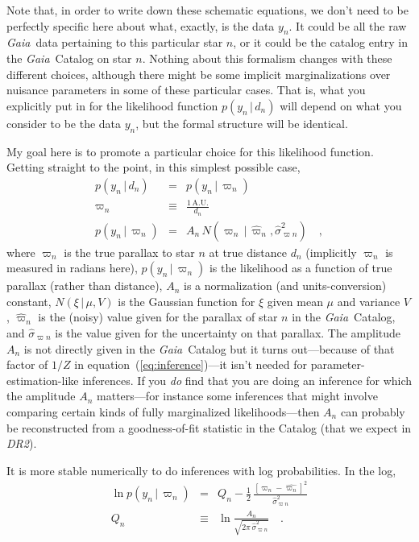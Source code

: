 \documentclass[12pt, modern]{aastex62h}
\newcommand{\acronym}[1]{{\small{#1}}}
\newcommand{\Gaia}{\textsl{Gaia}}
\newcommand{\DRtwo}{\textsl{\acronym{DR2}}}
\newcommand{\equationname}{equation}
\newcommand{\AU}{\mathrm{A.U.}}
\newcommand{\given}{\,|\,}
\begin{document}
Note that, in order to write down these schematic equations,
we don't need to be perfectly specific here about what, exactly,
is the data $y_n$.
It could be all the raw \Gaia\ data pertaining to this particular star $n$,
or it could be the catalog entry in the \Gaia\ Catalog on star $n$.
Nothing about this formalism changes with these different choices,
although there might be some implicit marginalizations over nuisance
parameters in some of these particular cases.
That is, what you explicitly put in for the likelihood function $p(y_n\given d_n)$
will depend on what you consider to be the data $y_n$, but the formal structure
will be identical.

My goal here is to promote a particular choice for this likelihood function.
Getting straight to the point, in this simplest possible case, 
\begin{eqnarray}
p(y_n\given d_n) &=& p(y_n\given\varpi_n)
\label{eq:gotoparallax}
\\
\varpi_n &\equiv& \frac{1\,\AU}{d_n}
\\
p(y_n\given\varpi_n) &=& A_n\,N(\varpi_n\given\hat{\varpi}_n,\hat{\sigma}^2_{\varpi n})
\label{eq:onedlike}
\quad ,
\end{eqnarray}
where
$\varpi_n$ is the true parallax to star $n$ at true distance $d_n$ (implicitly $\varpi_n$ is measured in radians here),
$p(y_n\given\varpi_n)$ is the likelihood as a function of true parallax (rather than distance),
$A_n$ is a normalization (and units-conversion) constant,
$N(\xi\given\mu,V)$ is the Gaussian function for $\xi$ given mean $\mu$ and variance $V$,
$\hat{\varpi}_n$ is the (noisy) value given for the parallax of star $n$ in the \Gaia\ Catalog,
and $\hat{\sigma}_{\varpi n}$ is the value given for the uncertainty on that parallax.
The amplitude $A_n$ is not directly given in the \Gaia\ Catalog
but it turns out---because of that factor of $1/Z$ in
\equationname~(\ref{eq:inference})---it isn't needed for parameter-estimation-like
inferences.
If you \emph{do} find that you are doing an inference for which the amplitude
$A_n$ matters---for instance some inferences that might involve comparing certain
kinds of fully marginalized likelihoods---then $A_n$ can probably be reconstructed
from a goodness-of-fit statistic in the Catalog (that we expect in \DRtwo).

It is more stable numerically to do inferences with log probabilities.
In the log,
\begin{eqnarray}
\ln p(y_n\given\varpi_n) &=& Q_n - \frac{1}{2}\,\frac{[\varpi_n - \hat{\varpi_n}]^2}{\hat{\sigma}^2_{\varpi n}}
\\
Q_n &\equiv& \ln\frac{A_n}{\sqrt{2\pi\,\hat{\sigma}^2_{\varpi n}}}
\quad .
\end{eqnarray}
\end{document}
